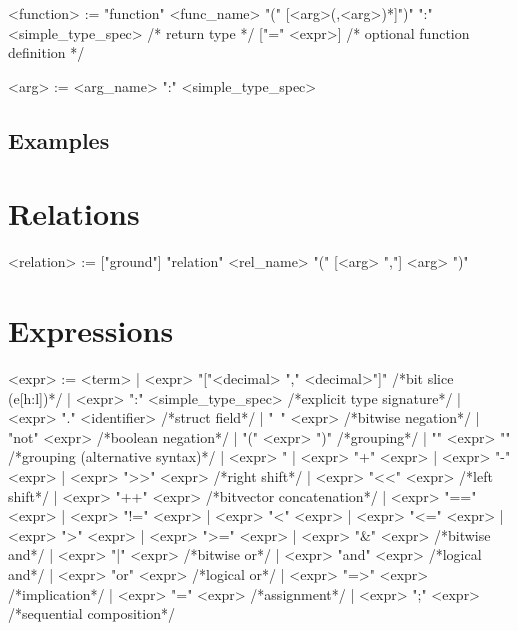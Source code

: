 \documentclass{report}
\begin{document}
\begin{bnflisting}{}
<function> := "function" <func_name> "(" [<arg>(,<arg>)*]")"
              ":" <simple_type_spec> /* return type */
              ["=" <expr>]    /* optional function definition */
\end{bnflisting}

\begin{bnflisting}{}
<arg> := <arg_name> ":" <simple_type_spec>
\end{bnflisting}

\subsection*{Examples}


\section{Relations}

\begin{bnflisting}{}
<relation> := ["ground"] "relation" <rel_name> "(" [<arg> ","] <arg> ")"
\end{bnflisting}

\section{Expressions}


\begin{bnflisting}{}
<expr> := <term>
        | <expr> "["<decimal> "," <decimal>"]"  /*bit slice (e[h:l])*/
        | <expr> ":" <simple_type_spec>         /*explicit type signature*/
        | <expr> "." <identifier>               /*struct field*/
        | "~" <expr>                            /*bitwise negation*/
        | "not" <expr>                          /*boolean negation*/
        | "(" <expr> ")"                        /*grouping*/
        | "{" <expr> "}"                        /*grouping (alternative syntax)*/
        | <expr> "%
        | <expr> "+" <expr>
        | <expr> "-" <expr>
        | <expr> ">>" <expr>                    /*right shift*/
        | <expr> "<<" <expr>                    /*left shift*/
        | <expr> "++" <expr>                    /*bitvector concatenation*/
        | <expr> "==" <expr>
        | <expr> "!=" <expr>
        | <expr> "<" <expr>
        | <expr> "<=" <expr>
        | <expr> ">" <expr>
        | <expr> ">=" <expr>
        | <expr> "&" <expr>                     /*bitwise and*/
        | <expr> "|" <expr>                     /*bitwise or*/
        | <expr> "and" <expr>                   /*logical and*/
        | <expr> "or" <expr>                    /*logical or*/
        | <expr> "=>" <expr>                    /*implication*/
        | <expr> "=" <expr>                     /*assignment*/
        | <expr> ";" <expr>                     /*sequential composition*/
\end{bnflisting}
\end{document}
